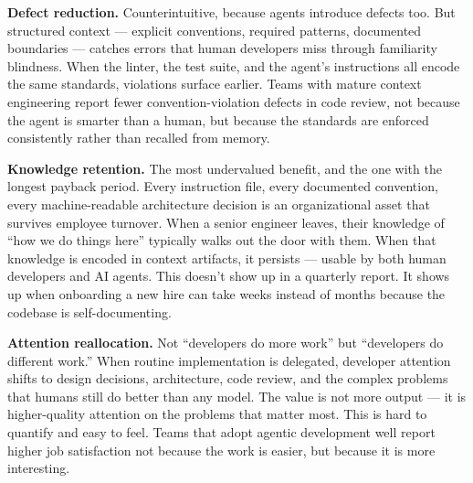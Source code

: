 \documentclass[
  a4paper,
  DIV=11,
  numbers=noendperiod]{scrreprt}
\begin{document}
\textbf{Defect reduction.} Counterintuitive, because agents introduce
defects too. But structured context --- explicit conventions, required
patterns, documented boundaries --- catches errors that human developers
miss through familiarity blindness. When the linter, the test suite, and
the agent's instructions all encode the same standards, violations
surface earlier. Teams with mature context engineering report fewer
convention-violation defects in code review, not because the agent is
smarter than a human, but because the standards are enforced
consistently rather than recalled from memory.

\textbf{Knowledge retention.} The most undervalued benefit, and the one
with the longest payback period. Every instruction file, every
documented convention, every machine-readable architecture decision is
an organizational asset that survives employee turnover. When a senior
engineer leaves, their knowledge of ``how we do things here'' typically
walks out the door with them. When that knowledge is encoded in context
artifacts, it persists --- usable by both human developers and AI
agents. This doesn't show up in a quarterly report. It shows up when
onboarding a new hire can take weeks instead of months because the
codebase is self-documenting.

\textbf{Attention reallocation.} Not ``developers do more work'' but
``developers do different work.'' When routine implementation is
delegated, developer attention shifts to design decisions, architecture,
code review, and the complex problems that humans still do better than
any model. The value is not more output --- it is higher-quality
attention on the problems that matter most. This is hard to quantify and
easy to feel. Teams that adopt agentic development well report higher
job satisfaction not because the work is easier, but because it is more
interesting.
\end{document}
